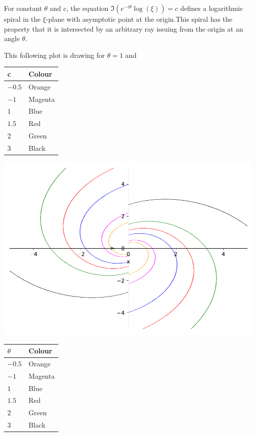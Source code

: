 \documentclass[
]{book}
\theoremstyle{definition}
\theoremstyle{definition}
\theoremstyle{definition}
\theoremstyle{definition}
\theoremstyle{remark}
\begin{document}
For constant \(\theta\) and \(c\), the equation \(\Im(e^{-i\theta}\log(\xi))=c\) defines a logarithmic spiral in the \(\xi\)-plane with asymptotic point at the origin.This spiral has the property that it is intersected by an arbitrary ray issuing from the origin at an angle \(\theta\).

This following plot is drawing for \(\theta=1\) and

\begin{longtable}[]{@{}ll@{}}
\toprule\noalign{}
c & Colour \\
\midrule\noalign{}
\endhead
\bottomrule\noalign{}
\endlastfoot
\(-0.5\) & Orange \\
\(-1\) & Magenta \\
\(1\) & Blue \\
\(1.5\) & Red \\
\(2\) & Green \\
\(3\) & Black \\
\end{longtable}

\includegraphics{ConformalMapping_files/figure-latex/unnamed-chunk-63-15.pdf}

\begin{longtable}[]{@{}ll@{}}
\toprule\noalign{}
\(\theta\) & Colour \\
\midrule\noalign{}
\endhead
\bottomrule\noalign{}
\endlastfoot
\(-0.5\) & Orange \\
\(-1\) & Magenta \\
\(1\) & Blue \\
\(1.5\) & Red \\
\(2\) & Green \\
\(3\) & Black \\
\end{longtable}
\end{document}
